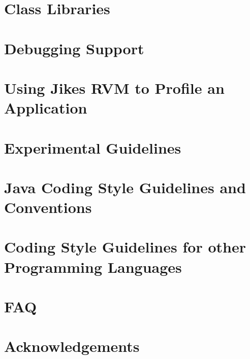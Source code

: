 \documentclass{article}
\newcommand{\jrvm}{Jikes RVM}
\begin{document}
\T \newpage
{}
\section{Class Libraries}
\label{section:libraries}


\T \newpage
{}
\section{Debugging Support}
\label{section:debugging}


\T \newpage
{}
\section{Using \jrvm{} to Profile an Application}


\T \newpage
{}
\section{Experimental Guidelines}


\T \newpage
{}
\section{Java Coding Style Guidelines and Conventions}
\label{section:javacodingstyle}


\T \newpage
{}
\section{Coding Style Guidelines for other Programming Languages}
\label{section:codingstyle-nonjava}


\T \newpage
{}
\section{FAQ}


\T \newpage
{}
\section*{Acknowledgements}


\T \newpage
\T 
\T 

\T \newpage

\T \appendix
\end{document}
